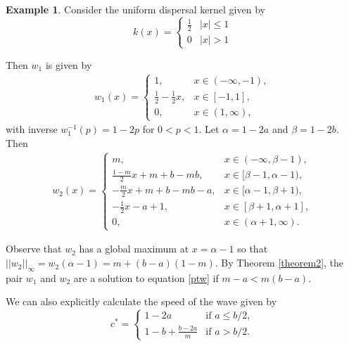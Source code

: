 \documentclass[11pt]{article}
\theoremstyle{definition}
\newtheorem{ex}[thm]{Example}
\numberwithin{equation}{section}
\numberwithin{thm}{section}
\begin{document}
\begin{ex}
Consider the uniform dispersal kernel given by
\begin{equation}
k(x) = \begin{cases}
\frac{1}{2} & |x|\leq 1 \\
0 & |x| > 1
\end{cases} \end{equation}

Then $w_1$ is given by
\begin{equation}  \label{uniformw1}
\begin{aligned}
w_1(x) 
= \begin{cases}
1, & x \in (-\infty, -1), \\
\frac{1}{2}-\frac{1}{2}x, & x \in [-1, 1] ,\\
0, & x \in (1, \infty),
\end{cases}
\end{aligned} \end{equation}
with inverse $w_1^{-1}(p)=1-2p$ for $0<p<1$. Let $\alpha=1-2a$ and $\beta=1-2b$. Then
\begin{equation} \label{uniformw2}
\begin{aligned}
w_2(x) 
= \begin{cases}
m,
& x \in (-\infty, \beta-1), \\
\frac{1-m}{2}x + m + b - mb,
& x \in [\beta - 1, 
 \alpha- 1), \\
-\frac{m}{2}x +m+b- mb-a,
& x \in [\alpha - 1, \beta + 1), \\
-\frac{1}{2} x-a+1,
& x \in [\beta + 1, \alpha + 1], \\
0,
& x \in (\alpha+1,\infty).
\end{cases}
\end{aligned} \end{equation}

Observe that $w_2$ has a global maximum at $x=\alpha-1$ so that $||w_2||_\infty=w_2(\alpha-1)=m+(b-a)(1-m)$. By Theorem \ref{theorem2}, the pair $w_1$ and $w_2$ are a solution to equation \eqref{ptw} if $m-a<m(b-a)$.

We can also explicitly calculate the speed of the wave given by
\begin{equation} \label{clinear}
c^* = \begin{cases}
1 - 2a & \text{if } a \leq b/2, \\
1 -b + \frac{b - 2a}{m} & \text{if }a > b/2.
\end{cases}
\end{equation}
\end{ex}
\end{document}
